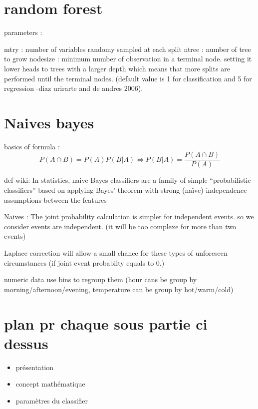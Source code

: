 \documentclass[
]{report}
\providecommand{\tightlist}{%
  \setlength{\itemsep}{0pt}\setlength{\parskip}{0pt}}
\begin{document}
\hypertarget{random-forest}{%
\section{random forest}\label{random-forest}}

parameters :

mtry : number of variables randomy sampled at each split
ntree : number of tree to grow
nodesize : minimum number of observation in a terminal node. setting it lower heads to trees with a larger depth which means that more splits are performed until the terminal nodes. (default value is 1 for classification and 5 for regression -diaz urirarte and de andres 2006).

\hypertarget{naives-bayes}{%
\section{Naives bayes}\label{naives-bayes}}

basics of formula : \[P(A ∩ B) = P(A) P(B|A) \iff P(B|A) = \frac{P(A ∩ B)}{P(A)}\]

def wiki: In statistics, naive Bayes classifiers are a family of simple ``probabilistic classifiers'' based on applying Bayes' theorem with strong (naïve) independence assumptions between the features

Naives : The joint probability calculation is simpler for independent events. so we consider events are independent. (it will be too complexe for more than two events)

Laplace correction will allow a small chance for these types of unforeseen circumstances (if joint event probabilty equals to 0.)

numeric data use bins to regroup them (hour cans be group by morning/afternoon/evening, temperature can be group by hot/warm/cold)

\hypertarget{plan-pr-chaque-sous-partie-ci-dessus}{%
\section{plan pr chaque sous partie ci dessus}\label{plan-pr-chaque-sous-partie-ci-dessus}}

\begin{itemize}
\tightlist
\item
  présentation
\item
  concept mathématique
\item
  paramètres du classifier
\end{itemize}
\end{document}
